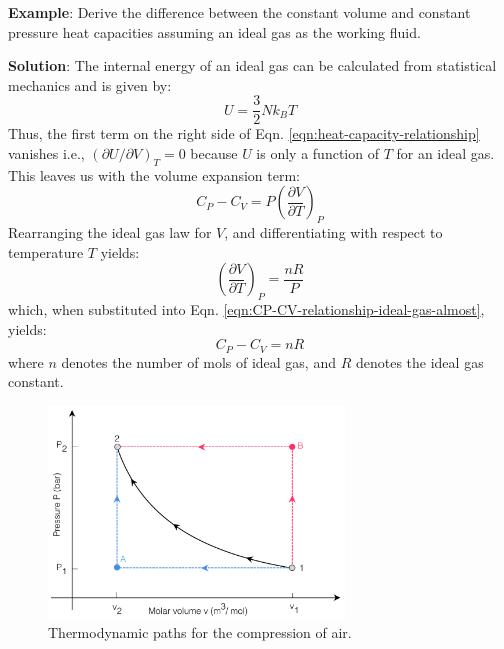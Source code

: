 \documentclass[11pt]{article}
\theoremstyle{definition}
\begin{document}
\clearpage
\begin{mdframed}[backgroundcolor=lgray]
\noindent\textbf{Example}: Derive the difference between the constant volume and constant pressure heat capacities assuming an ideal gas as the working fluid.

\vspace{0.1in}
\noindent\textbf{Solution}:
The internal energy of an ideal gas can be calculated from statistical mechanics and is given by:
\begin{equation}
	U = \frac{3}{2}Nk_{B}T
\end{equation}Thus, the first term on the right side of Eqn. \eqref{eqn:heat-capacity-relationship} vanishes i.e., $\left(\partial{U}/\partial{V}\right)_{T} = 0$ because
$U$ is only a function of $T$ for an ideal gas. This leaves us with the volume expansion term:
\begin{equation}\label{eqn:CP-CV-relationship-ideal-gas-almost}
	C_{P} - C_{V} = P\left(\frac{\partial{V}}{\partial{T}}\right)_{P}
\end{equation}Rearranging the ideal gas law for $V$, and differentiating with respect to temperature $T$ yields:
\begin{equation}
	\left(\frac{\partial{V}}{\partial{T}}\right)_{P} = \frac{nR}{P}
\end{equation}which, when substituted into Eqn. \eqref{eqn:CP-CV-relationship-ideal-gas-almost}, yields:
\begin{equation}
	C_{P} - C_{V} = nR
\end{equation}where $n$ denotes the number of mols of ideal gas, and $R$ denotes the ideal gas constant.
\end{mdframed}

\clearpage

\begin{figure}\center
	\includegraphics[width=0.70\textwidth]{./figs/Example-PV-Diagram.pdf}
	\caption{Thermodynamic paths for the compression of air.}
	\label{fig:example-pv-diagram}
\end{figure}
\end{document}
